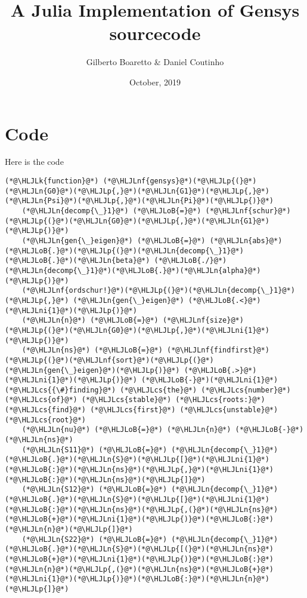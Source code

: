 \documentclass[12pt,a4paper]{article}
\title{ A Julia Implementation of Gensys sourcecode }
\author{ Gilberto Boaretto \& Daniel Coutinho }
\date{ October, 2019 }
\newcommand{\HLJLk}[1]{\textcolor[RGB]{148,91,176}{\textbf{#1}}}
\newcommand{\HLJLn}[1]{#1}
\newcommand{\HLJLnf}[1]{\textcolor[RGB]{66,102,213}{#1}}
\newcommand{\HLJLni}[1]{\textcolor[RGB]{59,151,46}{#1}}
\newcommand{\HLJLoB}[1]{\textcolor[RGB]{102,102,102}{\textbf{#1}}}
\newcommand{\HLJLp}[1]{#1}
\newcommand{\HLJLcs}[1]{\textcolor[RGB]{153,153,119}{\textit{#1}}}
\begin{document}
\maketitle

\section{Code}
Here is the code


\begin{lstlisting}
(*@\HLJLk{function}@*) (*@\HLJLnf{gensys}@*)(*@\HLJLp{(}@*)(*@\HLJLn{G0}@*)(*@\HLJLp{,}@*)(*@\HLJLn{G1}@*)(*@\HLJLp{,}@*)(*@\HLJLn{Psi}@*)(*@\HLJLp{,}@*)(*@\HLJLn{Pi}@*)(*@\HLJLp{)}@*)
    (*@\HLJLn{decomp{\_}1}@*) (*@\HLJLoB{=}@*) (*@\HLJLnf{schur}@*)(*@\HLJLp{(}@*)(*@\HLJLn{G0}@*)(*@\HLJLp{,}@*)(*@\HLJLn{G1}@*)(*@\HLJLp{)}@*)
    (*@\HLJLn{gen{\_}eigen}@*) (*@\HLJLoB{=}@*) (*@\HLJLn{abs}@*)(*@\HLJLoB{.}@*)(*@\HLJLp{(}@*)(*@\HLJLn{decomp{\_}1}@*)(*@\HLJLoB{.}@*)(*@\HLJLn{beta}@*) (*@\HLJLoB{./}@*) (*@\HLJLn{decomp{\_}1}@*)(*@\HLJLoB{.}@*)(*@\HLJLn{alpha}@*)(*@\HLJLp{)}@*)
    (*@\HLJLnf{ordschur!}@*)(*@\HLJLp{(}@*)(*@\HLJLn{decomp{\_}1}@*)(*@\HLJLp{,}@*) (*@\HLJLn{gen{\_}eigen}@*) (*@\HLJLoB{.<}@*) (*@\HLJLni{1}@*)(*@\HLJLp{)}@*)
    (*@\HLJLn{n}@*) (*@\HLJLoB{=}@*) (*@\HLJLnf{size}@*)(*@\HLJLp{(}@*)(*@\HLJLn{G0}@*)(*@\HLJLp{,}@*)(*@\HLJLni{1}@*)(*@\HLJLp{)}@*)
    (*@\HLJLn{ns}@*) (*@\HLJLoB{=}@*) (*@\HLJLnf{findfirst}@*)(*@\HLJLp{(}@*)(*@\HLJLnf{sort}@*)(*@\HLJLp{(}@*)(*@\HLJLn{gen{\_}eigen}@*)(*@\HLJLp{)}@*) (*@\HLJLoB{.>}@*) (*@\HLJLni{1}@*)(*@\HLJLp{)}@*) (*@\HLJLoB{-}@*)(*@\HLJLni{1}@*) (*@\HLJLcs{{\#}finding}@*) (*@\HLJLcs{the}@*) (*@\HLJLcs{number}@*) (*@\HLJLcs{of}@*) (*@\HLJLcs{stable}@*) (*@\HLJLcs{roots:}@*) (*@\HLJLcs{find}@*) (*@\HLJLcs{first}@*) (*@\HLJLcs{unstable}@*) (*@\HLJLcs{root}@*)
    (*@\HLJLn{nu}@*) (*@\HLJLoB{=}@*) (*@\HLJLn{n}@*) (*@\HLJLoB{-}@*) (*@\HLJLn{ns}@*)
    (*@\HLJLn{S11}@*) (*@\HLJLoB{=}@*) (*@\HLJLn{decomp{\_}1}@*)(*@\HLJLoB{.}@*)(*@\HLJLn{S}@*)(*@\HLJLp{[}@*)(*@\HLJLni{1}@*)(*@\HLJLoB{:}@*)(*@\HLJLn{ns}@*)(*@\HLJLp{,}@*)(*@\HLJLni{1}@*)(*@\HLJLoB{:}@*)(*@\HLJLn{ns}@*)(*@\HLJLp{]}@*)
    (*@\HLJLn{S12}@*) (*@\HLJLoB{=}@*) (*@\HLJLn{decomp{\_}1}@*)(*@\HLJLoB{.}@*)(*@\HLJLn{S}@*)(*@\HLJLp{[}@*)(*@\HLJLni{1}@*)(*@\HLJLoB{:}@*)(*@\HLJLn{ns}@*)(*@\HLJLp{,(}@*)(*@\HLJLn{ns}@*)(*@\HLJLoB{+}@*)(*@\HLJLni{1}@*)(*@\HLJLp{)}@*)(*@\HLJLoB{:}@*)(*@\HLJLn{n}@*)(*@\HLJLp{]}@*)
    (*@\HLJLn{S22}@*) (*@\HLJLoB{=}@*) (*@\HLJLn{decomp{\_}1}@*)(*@\HLJLoB{.}@*)(*@\HLJLn{S}@*)(*@\HLJLp{[(}@*)(*@\HLJLn{ns}@*)(*@\HLJLoB{+}@*)(*@\HLJLni{1}@*)(*@\HLJLp{)}@*)(*@\HLJLoB{:}@*)(*@\HLJLn{n}@*)(*@\HLJLp{,(}@*)(*@\HLJLn{ns}@*)(*@\HLJLoB{+}@*)(*@\HLJLni{1}@*)(*@\HLJLp{)}@*)(*@\HLJLoB{:}@*)(*@\HLJLn{n}@*)(*@\HLJLp{]}@*)


\end{lstlisting}
\end{document}
